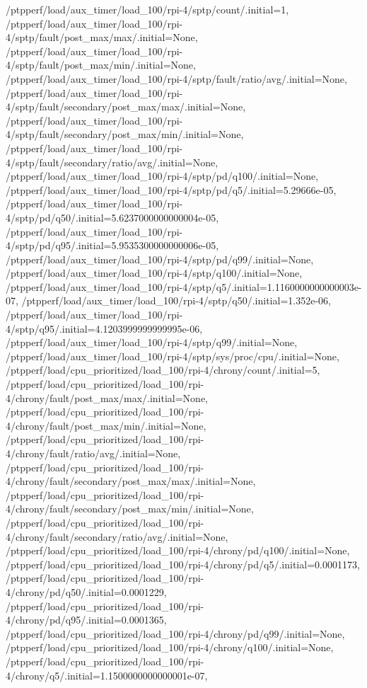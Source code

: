 {    /ptpperf/load/aux_timer/load_100/rpi-4/sptp/count/.initial=1,
    /ptpperf/load/aux_timer/load_100/rpi-4/sptp/fault/post_max/max/.initial=None,
    /ptpperf/load/aux_timer/load_100/rpi-4/sptp/fault/post_max/min/.initial=None,
    /ptpperf/load/aux_timer/load_100/rpi-4/sptp/fault/ratio/avg/.initial=None,
    /ptpperf/load/aux_timer/load_100/rpi-4/sptp/fault/secondary/post_max/max/.initial=None,
    /ptpperf/load/aux_timer/load_100/rpi-4/sptp/fault/secondary/post_max/min/.initial=None,
    /ptpperf/load/aux_timer/load_100/rpi-4/sptp/fault/secondary/ratio/avg/.initial=None,
    /ptpperf/load/aux_timer/load_100/rpi-4/sptp/pd/q100/.initial=None,
    /ptpperf/load/aux_timer/load_100/rpi-4/sptp/pd/q5/.initial=5.29666e-05,
    /ptpperf/load/aux_timer/load_100/rpi-4/sptp/pd/q50/.initial=5.6237000000000004e-05,
    /ptpperf/load/aux_timer/load_100/rpi-4/sptp/pd/q95/.initial=5.9535300000000006e-05,
    /ptpperf/load/aux_timer/load_100/rpi-4/sptp/pd/q99/.initial=None,
    /ptpperf/load/aux_timer/load_100/rpi-4/sptp/q100/.initial=None,
    /ptpperf/load/aux_timer/load_100/rpi-4/sptp/q5/.initial=1.1160000000000003e-07,
    /ptpperf/load/aux_timer/load_100/rpi-4/sptp/q50/.initial=1.352e-06,
    /ptpperf/load/aux_timer/load_100/rpi-4/sptp/q95/.initial=4.1203999999999995e-06,
    /ptpperf/load/aux_timer/load_100/rpi-4/sptp/q99/.initial=None,
    /ptpperf/load/aux_timer/load_100/rpi-4/sptp/sys/proc/cpu/.initial=None,
    /ptpperf/load/cpu_prioritized/load_100/rpi-4/chrony/count/.initial=5,
    /ptpperf/load/cpu_prioritized/load_100/rpi-4/chrony/fault/post_max/max/.initial=None,
    /ptpperf/load/cpu_prioritized/load_100/rpi-4/chrony/fault/post_max/min/.initial=None,
    /ptpperf/load/cpu_prioritized/load_100/rpi-4/chrony/fault/ratio/avg/.initial=None,
    /ptpperf/load/cpu_prioritized/load_100/rpi-4/chrony/fault/secondary/post_max/max/.initial=None,
    /ptpperf/load/cpu_prioritized/load_100/rpi-4/chrony/fault/secondary/post_max/min/.initial=None,
    /ptpperf/load/cpu_prioritized/load_100/rpi-4/chrony/fault/secondary/ratio/avg/.initial=None,
    /ptpperf/load/cpu_prioritized/load_100/rpi-4/chrony/pd/q100/.initial=None,
    /ptpperf/load/cpu_prioritized/load_100/rpi-4/chrony/pd/q5/.initial=0.0001173,
    /ptpperf/load/cpu_prioritized/load_100/rpi-4/chrony/pd/q50/.initial=0.0001229,
    /ptpperf/load/cpu_prioritized/load_100/rpi-4/chrony/pd/q95/.initial=0.0001365,
    /ptpperf/load/cpu_prioritized/load_100/rpi-4/chrony/pd/q99/.initial=None,
    /ptpperf/load/cpu_prioritized/load_100/rpi-4/chrony/q100/.initial=None,
    /ptpperf/load/cpu_prioritized/load_100/rpi-4/chrony/q5/.initial=1.1500000000000001e-07,
}
